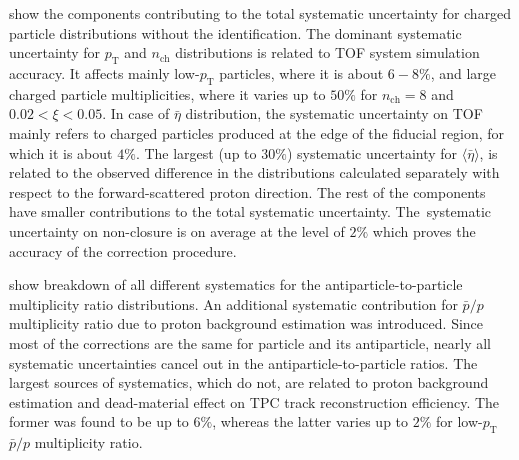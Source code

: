  show the components contributing to the total systematic uncertainty for charged particle distributions without the identification. The dominant systematic uncertainty for $p_\textrm{T}$ and $n_\textrm{ch}$ distributions is related to TOF system simulation accuracy. It affects mainly low-$p_\textrm{T}$ particles, where it is about $6-8\%$, and large charged particle multiplicities, where it varies up to $50\%$ for $n_\textrm{ch}=8$ and $0.02 < \xi < 0.05$. In case of $\bar{\eta}$ distribution, the systematic uncertainty on TOF mainly refers to charged particles produced at the edge of the fiducial region, for which it is about $4\%$.  The largest (up to $30\%$) systematic uncertainty for $\langle\bar{\eta}\rangle$,  is related to the observed difference  in the distributions calculated separately with respect to the forward-scattered proton direction. The rest of the components have smaller contributions to the total systematic uncertainty. The~systematic uncertainty on non-closure is on average at the level of $2\%$ which proves  the accuracy of the correction procedure. 



 show breakdown of all different systematics for the antiparticle-to-particle multiplicity ratio distributions. An additional systematic contribution for $\bar{p}/p$ multiplicity ratio due to proton background estimation was introduced.
Since most of the corrections are the same for particle and its antiparticle, nearly all systematic uncertainties cancel out in the antiparticle-to-particle ratios. 
The largest sources of systematics, which  do not, are related to proton background estimation and dead-material effect on TPC track reconstruction efficiency.  The former was found to be up to $6\%$, whereas the latter varies up to $2\%$ for low-$p_\textrm{T}$ $\bar{p}/p$ multiplicity ratio. 

